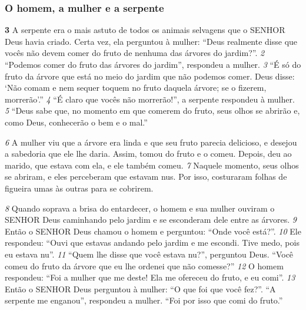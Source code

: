 \bigskip
\subsubsection*{O homem, a mulher e a serpente}
\textbf{\large 3}
A serpente era o mais astuto de todos os animais selvagens que o SENHOR
Deus havia criado. Certa vez, ela perguntou à mulher: “Deus realmente disse que
vocês não devem comer do fruto de nenhuma das árvores do jardim?”.
\textit{\tiny 2}
“Podemos comer do fruto das árvores do jardim”, respondeu a mulher. 
\textit{\tiny 3}
“É só
do fruto da árvore que está no meio do jardim que não podemos comer. Deus
disse: ‘Não comam e nem sequer toquem no fruto daquela árvore; se o fizerem,
morrerão’.”
\textit{\tiny 4}
“É claro que vocês não morrerão!”, a serpente respondeu à mulher. 
\textit{\tiny 5}
“Deus
sabe que, no momento em que comerem do fruto, seus olhos se abrirão e, como
Deus, conhecerão o bem e o mal.”

\bigskip
\textit{\tiny 6}
A mulher viu que a árvore era linda e que seu fruto parecia delicioso, e desejou
a sabedoria que ele lhe daria. Assim, tomou do fruto e o comeu. Depois, deu ao
marido, que estava com ela, e ele também comeu. 
\textit{\tiny 7}
Naquele momento, seus olhos
se abriram, e eles perceberam que estavam nus. Por isso, costuraram folhas de
figueira umas às outras para se cobrirem.

\bigskip
\textit{\tiny 8}
Quando soprava a brisa do entardecer, o homem e sua mulher ouviram o
SENHOR Deus caminhando pelo jardim e se esconderam dele entre as árvores.
\textit{\tiny 9}
Então o SENHOR Deus chamou o homem e perguntou: “Onde você está?”.
\textit{\tiny 10}
Ele respondeu: “Ouvi que estavas andando pelo jardim e me escondi. Tive
medo, pois eu estava nu”.
\textit{\tiny 11}
“Quem    lhe disse que você estava nu?”, perguntou Deus. “Você comeu do
fruto da árvore que eu lhe ordenei que não comesse?”
\textit{\tiny 12}
O homem respondeu: “Foi a mulher que me deste! Ela me ofereceu do fruto,
e eu comi”.
\textit{\tiny 13}
Então o SENHOR Deus perguntou à mulher: “O que foi que você fez?”.
   “A serpente me enganou”, respondeu a mulher. “Foi por isso que comi do
fruto.”


